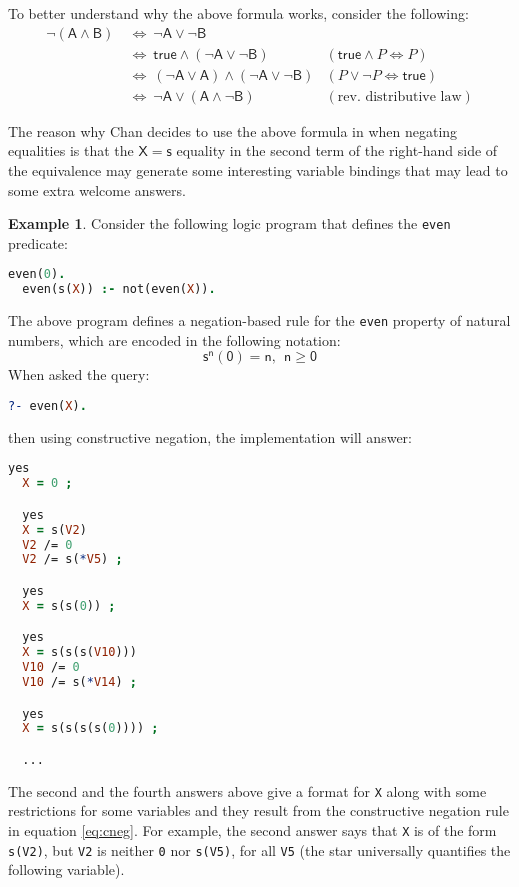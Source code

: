 \documentclass[inscr,ack,preface]{dithesis}
\theoremstyle{definition}
\newtheorem{example}{Example}[chapter]
\newcommand{\msf}[1]{$\mathsf{#1}$}
\begin{document}
To better understand why the above formula works, consider the following:
\begin{align*}
  \mathsf{\lnot \left( A \land B \right)} & ~\Leftrightarrow~ \mathsf{\lnot A \lor \lnot B} & ~ \\
                                          & ~\Leftrightarrow~ \mathsf{true \land \left( \lnot A \lor \lnot B \right)} & \left( \mathsf{true} \land P \Leftrightarrow P \right) \\
                                          & ~\Leftrightarrow~ \mathsf{\left( \lnot A \lor A \right) \land \left( \lnot A \lor \lnot B \right)} & \left( P \lor \lnot P \Leftrightarrow \mathsf{true} \right) \\
                                          & ~\Leftrightarrow~ \mathsf{\lnot A \lor \left( A \land \lnot B \right)} & (\text{rev. distributive law})
\end{align*}

The reason why Chan decides to use the above formula in \cite{DBLP:conf/iclp/Chan88} when negating equalities is that the \msf{X=s} equality in the second term of the right-hand side of the equivalence may generate some interesting variable bindings that may lead to some extra welcome answers.

\begin{example} Consider the following logic program that defines the \texttt{even} predicate:
\begin{lstlisting}[language=Prolog,frame=single]
  even(0).
  even(s(X)) :- not(even(X)).
\end{lstlisting}
\end{example}
The above program defines a negation-based rule for the \texttt{even} property of natural numbers, which are encoded in the following notation:
\[
  \mathsf{s^{n}(0) = n, ~~ n \ge 0}
\]
When asked the query:
\begin{lstlisting}[language=Prolog,frame=single]
  ?- even(X).
\end{lstlisting}
then using constructive negation, the implementation will answer:
\begin{lstlisting}[language=Prolog,frame=single]
  yes
  X = 0 ;

  yes
  X = s(V2)
  V2 /= 0
  V2 /= s(*V5) ;

  yes
  X = s(s(0)) ;

  yes
  X = s(s(s(V10)))
  V10 /= 0
  V10 /= s(*V14) ;

  yes
  X = s(s(s(s(0)))) ;

  ...
\end{lstlisting}
The second and the fourth answers above give a format for \texttt{X} along with some restrictions for some variables and they result from the constructive negation rule in equation \ref{eq:cneg}. For example, the second answer says that \texttt{X} is of the form \texttt{s(V2)}, but \texttt{V2} is neither \texttt{0} nor \texttt{s(V5)}, for all \texttt{V5} (the star universally quantifies the following variable).
\end{document}
